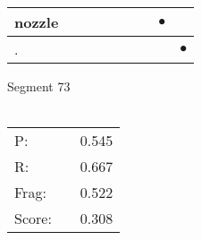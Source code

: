 \documentclass[landscape]{article}
\newcommand{\ssp}{\hspace{2pt}}
\newcommand{\mex}{\cellcolor{g}$\bullet$}
\begin{document}
\begin{tabular}{|l|p{10pt}|p{10pt}|p{10pt}|p{10pt}|p{10pt}|p{10pt}|p{10pt}|p{10pt}|}
\hline
\ssp \cellcolor{ref6}nozzle \ssp&\hspace{2pt}&\hspace{2pt}&\hspace{2pt}&\hspace{2pt}&\hspace{2pt}&\hspace{2pt}&\hspace{2pt}\mex&\hspace{2pt}\\
\hline
\ssp \cellcolor{ref7}. \ssp&\hspace{2pt}&\hspace{2pt}&\hspace{2pt}&\hspace{2pt}&\hspace{2pt}&\hspace{2pt}&\hspace{2pt}&\hspace{2pt}\mex\\
\hline
\end{tabular}

\vspace{6pt}
\noindent Segment 73\\\\
\noindent\begin{tabular}{lm{12pt}r}
\hline
P:&&0.545\\
R:&&0.667\\
Frag:&&0.522\\
Score:&&0.308\\
\end{tabular}

\newpage
\end{document}
